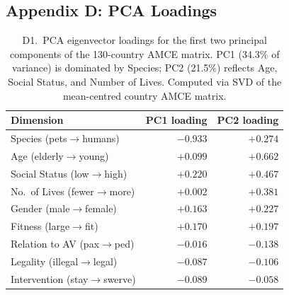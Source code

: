 \documentclass[11pt,letterpaper]{article}
\begin{document}
\begin{landscape}
\section*{Appendix D: PCA Loadings}

\begin{table}[H]
\caption{D1.\ PCA eigenvector loadings for the first two principal components of
the 130-country AMCE matrix. PC1 (34.3\% of variance) is dominated by Species;
PC2 (21.5\%) reflects Age, Social Status, and Number of Lives.
Computed via SVD of the mean-centred country AMCE matrix.}
\label{tab:pca_loadings}
\centering
\begin{tabular}{lrr}
\toprule
\textbf{Dimension} & \textbf{PC1 loading} & \textbf{PC2 loading} \\
\midrule
Species (pets$\to$humans)        & $-0.933$ & $+0.274$ \\
Age (elderly$\to$young)          & $+0.099$ & $+0.662$ \\
Social Status (low$\to$high)     & $+0.220$ & $+0.467$ \\
No.\ of Lives (fewer$\to$more)   & $+0.002$ & $+0.381$ \\
Gender (male$\to$female)         & $+0.163$ & $+0.227$ \\
Fitness (large$\to$fit)          & $+0.170$ & $+0.197$ \\
Relation to AV (pax$\to$ped)     & $-0.016$ & $-0.138$ \\
Legality (illegal$\to$legal)     & $-0.087$ & $-0.106$ \\
Intervention (stay$\to$swerve)   & $-0.089$ & $-0.058$ \\
\bottomrule
\end{tabular}
\end{table}


\end{landscape}
\end{document}

